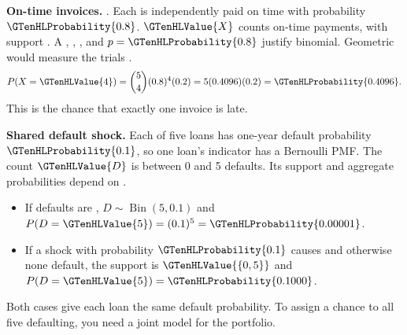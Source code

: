 \textbf{On-time invoices.} . Each is independently paid on time with probability \(\GTenHLProbability{0.8}\). \(\GTenHLValue{X}\) counts on-time payments, with support . A , , , and  \(p=\GTenHLProbability{0.8}\) justify binomial. Geometric would measure the trials .
\[
P(X=\GTenHLValue{4})=\binom54(0.8)^4(0.2)=5(0.4096)(0.2)=\GTenHLProbability{0.4096}.
\]
This is the chance that exactly one invoice is late.

\textbf{Shared default shock.} Each of five loans has one-year default probability \(\GTenHLProbability{0.1}\), so one loan's indicator has a Bernoulli PMF. The count \(\GTenHLValue{D}\) is between 0 and 5 defaults. Its support and aggregate probabilities depend on .
\begin{itemize}
\item If defaults are , \(D\sim\operatorname{Bin}(5,0.1)\) and \(P(D=\GTenHLValue{5})=(0.1)^5=\GTenHLProbability{0.00001}\).
\item If a shock with probability \(\GTenHLProbability{0.1}\) causes  and otherwise none default, the support is \(\GTenHLValue{\{0,5\}}\) and \(P(D=\GTenHLValue{5})=\GTenHLProbability{0.1000}\).
\end{itemize}
Both cases give each loan the same default probability. To assign a chance to all five defaulting, you need a joint model for the portfolio.
\par\nobreak
{}


